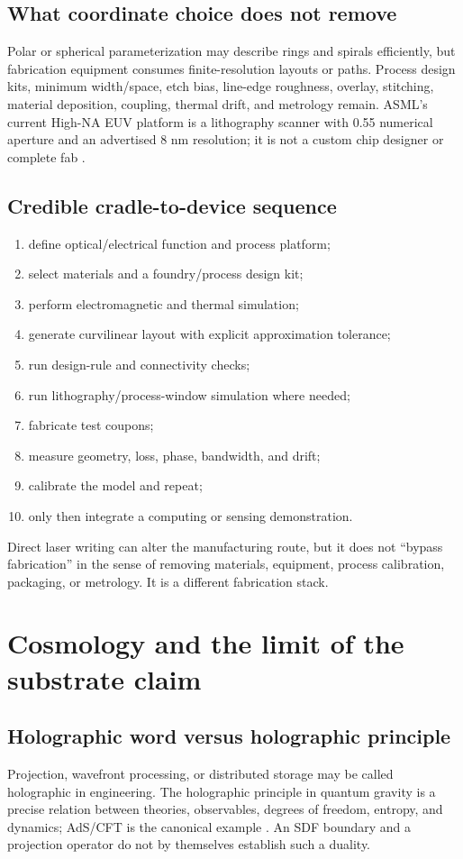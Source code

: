 \documentclass[11pt,a4paper,openany]{book}
\begin{document}
\section{What coordinate choice does not remove}
Polar or spherical parameterization may describe rings and spirals efficiently, but fabrication equipment consumes finite-resolution layouts or paths. Process design kits, minimum width/space, etch bias, line-edge roughness, overlay, stitching, material deposition, coupling, thermal drift, and metrology remain. ASML's current High-NA EUV platform is a lithography scanner with 0.55 numerical aperture and an advertised 8 nm resolution; it is not a custom chip designer or complete fab \citep{asml2026highna}.

\section{Credible cradle-to-device sequence}
\begin{enumerate}
  \item define optical/electrical function and process platform;
  \item select materials and a foundry/process design kit;
  \item perform electromagnetic and thermal simulation;
  \item generate curvilinear layout with explicit approximation tolerance;
  \item run design-rule and connectivity checks;
  \item run lithography/process-window simulation where needed;
  \item fabricate test coupons;
  \item measure geometry, loss, phase, bandwidth, and drift;
  \item calibrate the model and repeat;
  \item only then integrate a computing or sensing demonstration.
\end{enumerate}

Direct laser writing can alter the manufacturing route, but it does not ``bypass fabrication'' in the sense of removing materials, equipment, process calibration, packaging, or metrology. It is a different fabrication stack.

\chapter{Cosmology and the limit of the substrate claim}
\section{Holographic word versus holographic principle}
Projection, wavefront processing, or distributed storage may be called holographic in engineering. The holographic principle in quantum gravity is a precise relation between theories, observables, degrees of freedom, entropy, and dynamics; AdS/CFT is the canonical example \citep{maldacena1998}. An SDF boundary and a projection operator do not by themselves establish such a duality.
\end{document}
